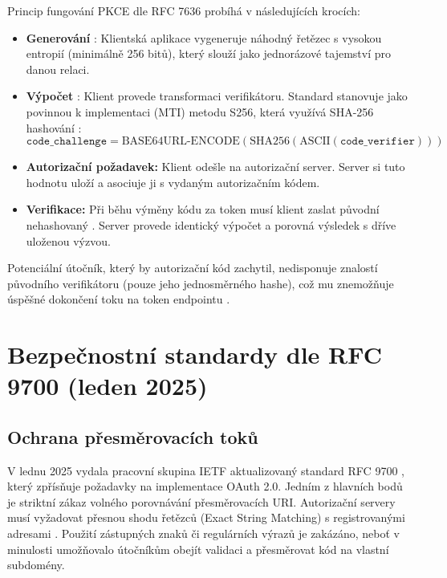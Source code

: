 \documentclass[male,czech,api_bc]{kitheses}
\begin{document}
Princip fungování PKCE dle RFC 7636 \cite{SakimuraEd2015} probíhá v následujících krocích:
\begin{itemize}
\item \textbf{Generování} : Klientská aplikace vygeneruje náhodný řetězec s vysokou entropií (minimálně 256 bitů), který slouží jako jednorázové tajemství pro danou relaci.

\item \textbf{Výpočet} : Klient provede transformaci verifikátoru. Standard stanovuje jako povinnou k implementaci (MTI) metodu S256, která využívá SHA-256 hashování \cite{SakimuraEd2015}: 
\[
\texttt{code\_challenge} = \text{BASE64URL-ENCODE}(\text{SHA256}(\text{ASCII}(\texttt{code\_verifier})))
\]

\item \textbf{Autorizační požadavek:} Klient odešle  na autorizační server. Server si tuto hodnotu uloží a asociuje ji s vydaným autorizačním kódem.

\item \textbf{Verifikace:} Při běhu výměny kódu za token musí klient zaslat původní nehashovaný . Server provede identický výpočet a porovná výsledek s dříve uloženou výzvou.
\end{itemize}

Potenciální útočník, který by autorizační kód zachytil, nedisponuje znalostí původního verifikátoru (pouze jeho jednosměrného hashe), což mu znemožňuje úspěšné dokončení toku na token endpointu \cite{SakimuraEd2015}.

\section{Bezpečnostní standardy dle RFC 9700 (leden 2025)}

\subsection{Ochrana přesměrovacích toků}

V lednu 2025 vydala pracovní skupina IETF aktualizovaný standard RFC 9700 \cite{Lodderstedt2025}, který zpřísňuje požadavky na implementace OAuth 2.0. Jedním z hlavních bodů je striktní zákaz volného porovnávání přesměrovacích URI. Autorizační servery musí vyžadovat přesnou shodu řetězců (Exact String Matching) s registrovanými adresami \cite{Lodderstedt2025}. Použití zástupných znaků či regulárních výrazů je zakázáno, neboť v minulosti umožňovalo útočníkům obejít validaci a přesměrovat kód na vlastní subdomény.
\end{document}
